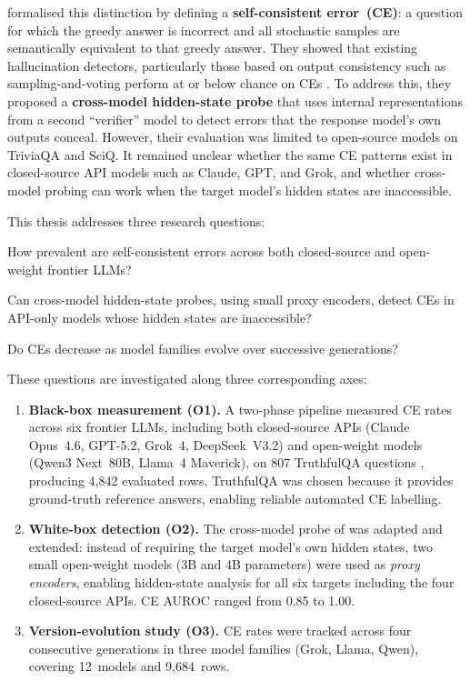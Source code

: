 \documentclass[12pt,twocolumn]{article}
\begin{document}
\citet{tan2025consistent} formalised this distinction by defining a
\textbf{self-consistent error~(CE)}: a question for which the greedy
answer is incorrect and all stochastic samples are semantically
equivalent to that greedy answer. They showed that existing
hallucination detectors, particularly those based on output
consistency such as sampling-and-voting
\citep{wang2023selfconsistency} perform at or below chance on CEs
\citep{tan2025consistent}.
To address this, they proposed a \textbf{cross-model hidden-state
probe} that uses internal representations from a second ``verifier''
model to detect errors that the response model's own outputs
conceal. However, their evaluation was limited to open-source models
on TriviaQA and SciQ. It remained unclear whether the same CE
patterns exist in closed-source API models such as Claude, GPT, and
Grok, and whether cross-model probing can work when the target
model's hidden states are inaccessible.

This thesis addresses three research questions:
\begin{description}[nosep,leftmargin=0.5cm,font=\normalfont\bfseries]
\item[RQ1:] How prevalent are self-consistent errors across both
  closed-source and open-weight frontier LLMs?
\item[RQ2:] Can cross-model hidden-state probes, using small proxy
  encoders, detect CEs in API-only models whose hidden states are
  inaccessible?
\item[RQ3:] Do CEs decrease as model families evolve over successive
  generations?
\end{description}

These questions are investigated along three corresponding axes:
\begin{enumerate}[nosep]
\item \textbf{Black-box measurement (O1).} A two-phase pipeline
      measured CE rates across six frontier LLMs, including both
      closed-source APIs (Claude Opus~4.6, GPT-5.2, Grok~4,
      DeepSeek~V3.2) and open-weight models (Qwen3 Next~80B,
      Llama~4 Maverick), on 807 TruthfulQA questions
      \citep{lin2022truthfulqa}, producing 4,842 evaluated rows.
      TruthfulQA was chosen because it provides ground-truth
      reference answers, enabling reliable automated CE labelling.
\item \textbf{White-box detection (O2).} The cross-model probe of
      \citet{tan2025consistent} was adapted and extended: instead of
      requiring the target model's own hidden states, two small
      open-weight models (3B and 4B parameters) were used as
      \emph{proxy encoders}, enabling hidden-state analysis for all
      six targets including the four closed-source APIs. CE AUROC
      ranged from 0.85 to 1.00.
\item \textbf{Version-evolution study (O3).} CE rates were tracked
      across four consecutive generations in three model families
      (Grok, Llama, Qwen), covering 12~models and 9,684~rows.
\end{enumerate}
\end{document}

